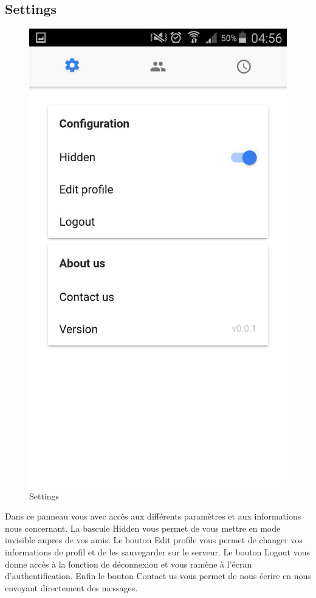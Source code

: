 \documentclass[french]{article}
\begin{document}
	
	\subsection{Settings}
	\begin{figure}[H]
		\centering
		\includegraphics[scale=0.4]{../screenshot/screenshot-settings}
		\caption{Settings}
		\label{Settings}
	\end{figure} 
	Dans ce panneau vous avec accès aux différents paramètres et aux informations nous concernant. La bascule Hidden vous permet de vous mettre en mode invisible aupres de vos amis. Le bouton Edit profile vous permet de changer vos informations de profil et de les sauvegarder sur le serveur.
	Le bouton Logout vous donne accès à la fonction de déconnexion et vous ramène à l'écran d'authentification. Enfin le bouton Contact us vous permet de nous écrire en nous envoyant directement des messages.
\end{document}
